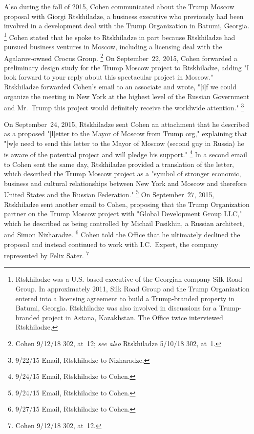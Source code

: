 Also during the fall of 2015, Cohen communicated about the Trump Moscow proposal with Giorgi Rtskhiladze, a business executive who previously had been involved in a development deal with the Trump Organization in Batumi, Georgia.%
\footnote{Rtskhiladze was a U.S.-based executive of the Georgian company Silk Road Group.
In approximately 2011, Silk Road Group and the Trump Organization entered into a licensing agreement to build a Trump-branded property in Batumi, Georgia.
Rtskhiladze was also involved in discussions for a Trump-branded project in Astana, Kazakhstan.
The Office twice interviewed Rtskhiladze, }
Cohen stated that he spoke to Rtskhiladze in part because Rtskhiladze had pursued business ventures in Moscow, including a licensing deal with the Agalarov-owned Crocus Group.%
\footnote{Cohen 9/12/18 302, at~12;
\textit{see also} Rtskhiladze 5/10/18 302, at~1.}
On September~22, 2015, Cohen forwarded a preliminary design study for the Trump Moscow project to Rtskhiladze, adding "I look forward to your reply about this spectacular project in Moscow."
Rtskhiladze forwarded Cohen's email to an associate and wrote, "[i]f we could organize the meeting in New York at the highest level of the Russian Government and Mr.~Trump this project would definitely receive the worldwide attention."%
\footnote{9/22/15 Email, Rtskhiladze to Nizharadze.}

On September~24, 2015, Rtskhiladze sent Cohen an attachment that he described as a proposed "[l]etter to the Mayor of Moscow from Trump org," explaining that "[w]e need to send this letter to the Mayor of Moscow (second guy in Russia) he is aware of the potential project and will pledge his support."%
\footnote{9/24/15 Email, Rtskhiladze to Cohen.}
In a second email to Cohen sent the same day, Rtskhiladze provided a translation of the letter, which described the Trump Moscow project as a "symbol of stronger economic, business and cultural relationships between New York and Moscow and therefore United States and the Russian Federation."%
\footnote{9/24/15 Email, Rtskhiladze to Cohen.}
On September~27, 2015, Rtskhiladze sent another email to Cohen, proposing that the Trump Organization partner on the Trump Moscow project with "Global Development Group LLC," which he described as being controlled by Michail Posikhin, a Russian architect, and Simon Nizharadze.%
\footnote{9/27/15 Email, Rtskhiladze to Cohen.}
Cohen told the Office that he ultimately declined the proposal and instead continued to work with I.C.~Expert, the company represented by Felix Sater.%
\footnote{Cohen 9/12/18 302, at~12.}

